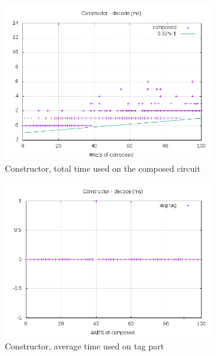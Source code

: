 \documentclass[10pt,a4paper]{article}
\begin{document}
\begin{figure}[h]
    \centering
    \begin{subfigure}[t]{0.3\textwidth}
        \includegraphics[width=\textwidth]{const_decode_plots}
        \caption{Constructor, total time used on the composed circuit}
    \end{subfigure}
    \begin{subfigure}[t]{0.3\textwidth}
        \includegraphics[width=\textwidth]{const_decode_avg}
        \caption{Constructor, average time used on tag part}
    \end{subfigure}
    \begin{subfigure}[t]{0.3\textwidth}

\end{subfigure}
\end{figure}
\end{document}
